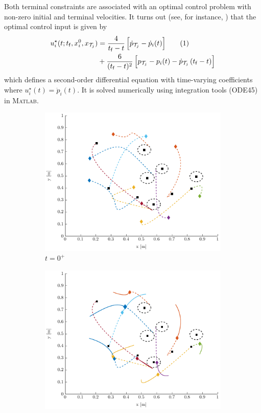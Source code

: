 \documentclass{ifacconf}
\newcommand{\f}{{\mathsf{f}}}
\newcommand{\cT}{\mathcal{T}}
\begin{document}
Both terminal constraints are associated with an optimal control problem with non-zero initial and terminal velocities. It turns out (see, for instance, \cite{p:battin1987}) that the optimal control input is given by 
\begin{align*}
u_i^{\star}(t;t_\f, x_i^0, x_{\cT_j}) & = \frac{4}{t_\f - t} \, \Big[\dot{p}_{\cT_j} - \dot{p}_i(t)\Big] \addtocounter{equation}{1}\tag{\theequation} \\
& + \frac{6}{(t_\f - t)^2} \, \Big[p_{\cT_j} - p_i(t) - \dot{p}_{\cT_j}\,(t_\f - t)\Big]
\end{align*}
which defines a second-order differential equation with time-varying coefficients where $u_i^{\star}(t) = \ddot{p}_i(t)$. It is solved numerically using integration tools (ODE45) in \textsc{Matlab}. 

\begin{figure}[h]
\centering
\begin{subfigure}{\linewidth}
  \centering
  \includegraphics[width=0.8\linewidth]{Figures/Alloc_5_5_t_0_CommLimit_0.pdf}
  \caption{$t=0^+$}
  \label{fig:ExUC_Im}
\end{subfigure}
\begin{subfigure}{\linewidth}
  \centering
  \includegraphics[width=0.8\linewidth]{Figures/Alloc_5_5_t_4_CommLimit_0.pdf}

\end{subfigure}
\end{figure}
\end{document}
